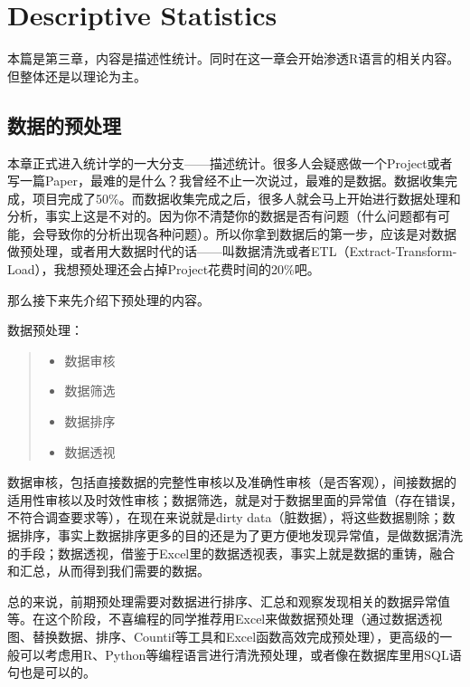 \documentclass[]{ctexbook}
\providecommand{\tightlist}{%
  \setlength{\itemsep}{0pt}\setlength{\parskip}{0pt}}
\begin{document}
\hypertarget{descriptive}{%
\chapter{Descriptive Statistics}\label{descriptive}}

本篇是第三章，内容是描述性统计。同时在这一章会开始渗透R语言的相关内容。但整体还是以理论为主。

\hypertarget{ux6570ux636eux7684ux9884ux5904ux7406}{%
\section{数据的预处理}\label{ux6570ux636eux7684ux9884ux5904ux7406}}

本章正式进入统计学的一大分支------描述统计。很多人会疑惑做一个Project或者写一篇Paper，最难的是什么？我曾经不止一次说过，最难的是数据。数据收集完成，项目完成了50\%。而数据收集完成之后，很多人就会马上开始进行数据处理和分析，事实上这是不对的。因为你不清楚你的数据是否有问题（什么问题都有可能，会导致你的分析出现各种问题）。所以你拿到数据后的第一步，应该是对数据做预处理，或者用大数据时代的话------叫数据清洗或者ETL（Extract-Transform-Load），我想预处理还会占掉Project花费时间的20\%吧。

那么接下来先介绍下预处理的内容。

数据预处理：

\begin{quote}
\begin{itemize}
\tightlist
\item
  数据审核
\item
  数据筛选
\item
  数据排序
\item
  数据透视
\end{itemize}
\end{quote}

数据审核，包括直接数据的完整性审核以及准确性审核（是否客观），间接数据的适用性审核以及时效性审核；数据筛选，就是对于数据里面的异常值（存在错误，不符合调查要求等），在现在来说就是dirty data（脏数据），将这些数据剔除；数据排序，事实上数据排序更多的目的还是为了更方便地发现异常值，是做数据清洗的手段；数据透视，借鉴于Excel里的数据透视表，事实上就是数据的重铸，融合和汇总，从而得到我们需要的数据。

总的来说，前期预处理需要对数据进行排序、汇总和观察发现相关的数据异常值等。在这个阶段，不喜编程的同学推荐用Excel来做数据预处理（通过数据透视图、替换数据、排序、Countif等工具和Excel函数高效完成预处理），更高级的一般可以考虑用R、Python等编程语言进行清洗预处理，或者像在数据库里用SQL语句也是可以的。
\end{document}
